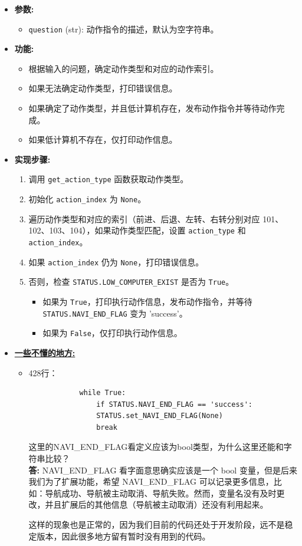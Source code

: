 \documentclass[]{article}
\begin{document}
\begin{itemize}
	\item \textbf{参数:}
	\begin{itemize}
		\item \texttt{question} (str): 动作指令的描述，默认为空字符串。
	\end{itemize}
	\item \textbf{功能:}
	\begin{itemize}
		\item 根据输入的问题，确定动作类型和对应的动作索引。
		\item 如果无法确定动作类型，打印错误信息。
		\item 如果确定了动作类型，并且低计算机存在，发布动作指令并等待动作完成。
		\item 如果低计算机不存在，仅打印动作信息。
	\end{itemize}
	\item \textbf{实现步骤:}
	\begin{enumerate}
		\item 调用 \texttt{get\_action\_type} 函数获取动作类型。
		\item 初始化 \texttt{action\_index} 为 \texttt{None}。
		\item 遍历动作类型和对应的索引（前进、后退、左转、右转分别对应 101、102、103、104），如果动作类型匹配，设置 \texttt{action\_type} 和 \texttt{action\_index}。
		\item 如果 \texttt{action\_index} 仍为 \texttt{None}，打印错误信息。
		\item 否则，检查 \texttt{STATUS.LOW\_COMPUTER\_EXIST} 是否为 \texttt{True}。
		\begin{itemize}
			\item 如果为 \texttt{True}，打印执行动作信息，发布动作指令，并等待 \texttt{STATUS.NAVI\_END\_FLAG} 变为 'success'。
			\item 如果为 \texttt{False}，仅打印执行动作信息。
		\end{itemize}
	\end{enumerate}
	\item \textbf{\underline{一些不懂的地方:}}
	\begin{itemize}
		\item  428行：\begin{verbatim}
			while True:
				if STATUS.NAVI_END_FLAG == 'success':
				STATUS.set_NAVI_END_FLAG(None)
				break
		\end{verbatim}{这里的NAVI\_END\_FLAG看定义应该为bool类型，为什么这里还能和字符串比较？}   \\  
		\textbf{答:} NAVI\_END\_FLAG 看字面意思确实应该是一个 bool 变量，但是后来我们为了扩展功能，希望 NAVI\_END\_FLAG 可以记录更多信息，比如：导航成功、导航被主动取消、导航失败。然而，变量名没有及时更改，并且扩展后的其他信息（导航被主动取消）还没有利用起来。
		
		\hspace{2em}这样的现象也是正常的，因为我们目前的代码还处于开发阶段，远不是稳定版本，因此很多地方留有暂时没有用到的代码。
	\end{itemize}
\end{itemize}
\end{document}
